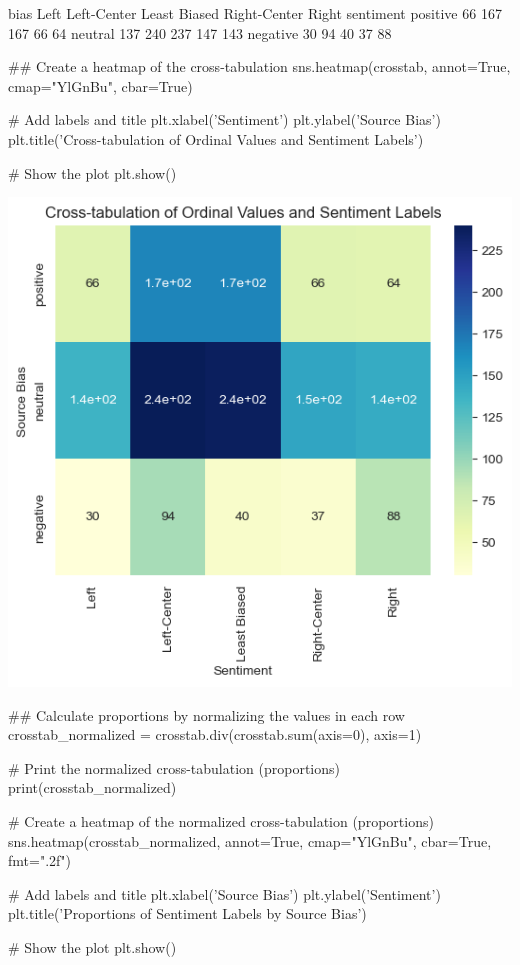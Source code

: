 \begin{pyprint}
bias       Left  Left-Center  Least Biased  Right-Center  Right
sentiment                                                      
positive     66          167           167            66     64
neutral     137          240           237           147    143
negative     30           94            40            37     88
\end{pyprint}

\begin{pyin}
\## Create a heatmap of the cross-tabulation
sns.heatmap(crosstab, annot=True, cmap="YlGnBu", cbar=True)

# Add labels and title
plt.xlabel('Sentiment')
plt.ylabel('Source Bias')
plt.title('Cross-tabulation of Ordinal Values and Sentiment Labels')

# Show the plot
plt.show()
\end{pyin}

\includegraphics[width=\textwidth]{./figs/fig_2.png}
\begin{pyin}
\## Calculate proportions by normalizing the values in each row
crosstab_normalized = crosstab.div(crosstab.sum(axis=0), axis=1)

# Print the normalized cross-tabulation (proportions)
print(crosstab_normalized)

# Create a heatmap of the normalized cross-tabulation (proportions)
sns.heatmap(crosstab_normalized, annot=True, cmap="YlGnBu", cbar=True, fmt=".2f")

# Add labels and title
plt.xlabel('Source Bias')
plt.ylabel('Sentiment')
plt.title('Proportions of Sentiment Labels by Source Bias')

# Show the plot
plt.show()
\end{pyin}

